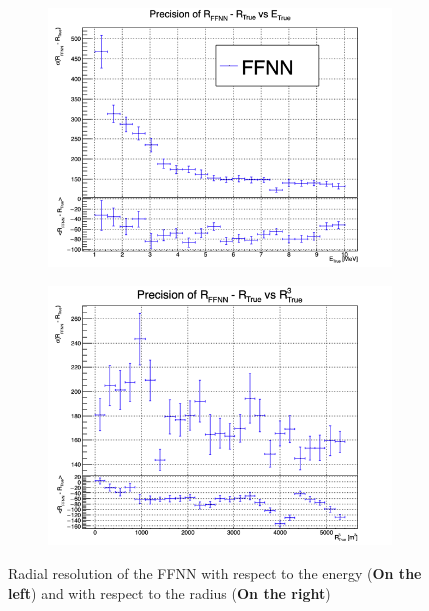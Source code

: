 \documentclass[../main.tex]{subfiles}
\begin{document}
\begin{figure}[ht]
  \centering
  \begin{subfigure}[t]{0.48\linewidth}
    \includegraphics[width=\linewidth]{images/janne/ffnn/SBE.png}
  \end{subfigure}
  \hfill
  \begin{subfigure}[t]{0.48\linewidth}
    \includegraphics[width=\linewidth]{images/janne/ffnn/SBR.png}
  \end{subfigure}
  \caption{Radial resolution of the FFNN with respect to the energy (\textbf{On the left}) and with respect to the radius (\textbf{On the right})}
  \label{fig:janne:ffnn:SB}
\end{figure}
\end{document}
